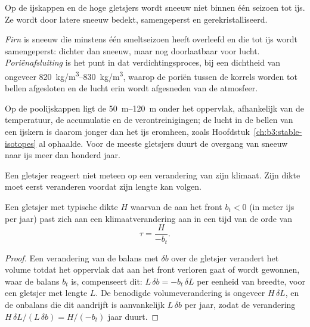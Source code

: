 Op de ijskappen en de hoge gletsjers wordt sneeuw niet binnen één
seizoen tot ijs. Ze wordt door latere sneeuw bedekt, samengeperst en gerekristalliseerd.

\begin{definition}\label{def:b3:glaciology:firn}
\emph{Firn} is sneeuw die minstens één smeltseizoen heeft overleefd
en die tot ijs wordt samengeperst: dichter dan sneeuw, maar nog
doorlaatbaar voor lucht. \emph{Poriënafsluiting} is het punt in dat
verdichtingsproces, bij een dichtheid van ongeveer \qtyrange{820}{830}{kg/m^3}, waarop de
poriën tussen de korrels worden tot bellen afgesloten en de lucht erin wordt
afgesneden van de atmosfeer.
\end{definition}

Op de poolijskappen ligt de  \qtyrange{50}{120}{m} onder het
oppervlak, afhankelijk van de temperatuur, de accumulatie en de
verontreinigingen; de lucht in de bellen van een ijskern is daarom jonger dan
het ijs eromheen, zoals Hoofdstuk~\ref{ch:b3:stable-isotopes} al ophaalde. Voor de
meeste gletsjers duurt de overgang van sneeuw naar ijs meer dan honderd jaar.

Een gletsjer reageert niet meteen op een verandering van zijn klimaat. Zijn
dikte moet eerst veranderen voordat zijn lengte kan volgen.

\begin{proposition}\label{prop:b3:glaciology:response}
Een gletsjer met typische dikte $H$ waarvan de  aan het front $b_t <
0$ (in meter ijs per jaar) past zich aan een klimaatverandering aan in een tijd van de
orde van
\[
\tau = \frac{H}{-b_t} .
\]
\end{proposition}

\begin{proof}
Een verandering van de balans met $\delta b$ over de gletsjer verandert het volume
totdat het oppervlak dat aan het front verloren gaat of wordt gewonnen, waar de balans $b_t$ is,
compenseert dit: $L\,\delta b = -b_t\,\delta L$ per eenheid van breedte, voor een
gletsjer met lengte $L$. De benodigde volumeverandering is ongeveer $H\,\delta L$, en
de onbalans die dit aandrijft is aanvankelijk $L\,\delta b$ per jaar, zodat de
verandering $H\,\delta L/(L\,\delta b) = H/(-b_t)$ jaar duurt.
\end{proof}

